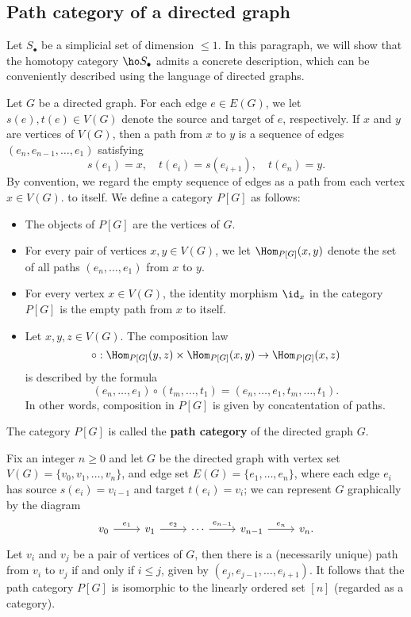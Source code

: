 \subsection{Path category of a directed graph}
Let $S_\bullet$ be a simplicial set of dimension $\leq 1$. In this paragraph, we will show that the homotopy category $\ho S_\bullet$ admits a concrete description, which can be conveniently described using the language of directed graphs.\par
Let $G$ be a directed graph. For each edge $e\in E(G)$, we let $s(e),t(e)\in V(G)$ denote the source and target of $e$, respectively. If $x$ and $y$ are vertices of $V(G)$, then a path from $x$ to $y$ is a sequence of edges $(e_n,e_{n-1},\dots,e_1)$ satisfying
\[s(e_1)=x,\quad t(e_i)=s(e_{i+1}),\quad t(e_n)=y.\]
 By convention, we regard the empty sequence of edges as a path from each vertex $x\in V(G)$. to itself. We define a category $P[G]$ as follows:
\begin{itemize}
\item The objects of $P[G]$ are the vertices of $G$.
\item For every pair of vertices $x,y\in V(G)$, we let $\Hom_{P[G]}(x,y)$ denote the set of all paths $(e_n,\dots,e_1)$ from $x$ to $y$.
\item For every vertex $x\in V(G)$, the identity morphism $\id_x$ in the category $P[G]$ is the empty path from $x$ to itself.
\item Let $x,y,z\in V(G)$. The composition law
\[\circ:\Hom_{P[G]}(y,z)\times\Hom_{P[G]}(x,y)\to\Hom_{P[G]}(x,z)\]
is described by the formula
\[(e_n,\dots,e_1)\circ(t_m,\dots,t_1)=(e_n,\dots,e_1,t_m,\dots,t_1).\]
In other words, composition in $P[G]$ is given by concatentation of paths.
\end{itemize}
The category $P[G]$ is called the \textbf{path category} of the directed graph $G$.
\begin{example}
Fix an integer $n\geq 0$ and let $G$ be the directed graph with vertex set $V(G)=\{v_0,v_1,\dots,v_n\}$, and edge set $E(G)=\{e_1,\dots,e_n\}$, where each edge $e_i$ has source $s(e_i)=v_{i-1}$ and target $t(e_i)=v_i$; we can represent $G$ graphically by the diagram
\[\begin{tikzcd}
v_0\ar[r,"e_1"]&v_1\ar[r,"e_2"]&\cdots\ar[r,"e_{n-1}"]&v_{n-1}\ar[r,"e_n"]&v_n.
\end{tikzcd}\]
Let $v_i$ and $v_j$ be a pair of vertices of $G$, then there is a (necessarily unique) path from $v_i$ to $v_j$ if and only if $i\leq j$, given by $(e_j,e_{j-1},\dots,e_{i+1})$. It follows that the path category $P[G]$ is isomorphic to the linearly ordered set $[n]$ (regarded as a category).
\end{example}
